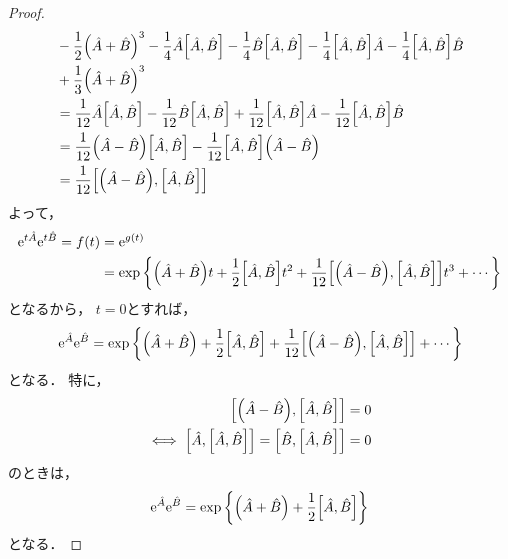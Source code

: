 \documentclass{report}
\begin{document}
\begin{proof}
\begin{align}
        &- \frac{1}{2}\qty(\hat{A} + \hat{B})^3 - \frac{1}{4}\hat{A}\qty[\hat{A}, \hat{B}] - \frac{1}{4}\hat{B}\qty[\hat{A}, \hat{B}] - \frac{1}{4}\qty[\hat{A}, \hat{B}]\hat{A} - \frac{1}{4}\qty[\hat{A}, \hat{B}]\hat{B} \notag \\ 
        &+ \frac{1}{3}\qty(\hat{A} + \hat{B})^3 \\ 
        &= \frac{1}{12}\hat{A}\qty[\hat{A}, \hat{B}] - \frac{1}{12}\hat{B}\qty[\hat{A}, \hat{B}] + \frac{1}{12}\qty[\hat{A}, \hat{B}]\hat{A} - \frac{1}{12}\qty[\hat{A}, \hat{B}]\hat{B} \\ 
        &= \frac{1}{12}\qty(\hat{A} - \hat{B})\qty[\hat{A}, \hat{B}] - \frac{1}{12}\qty[\hat{A}, \hat{B}]\qty(\hat{A} - \hat{B}) \\ 
        &= \frac{1}{12}\qty[\qty(\hat{A} - \hat{B}), \qty[\hat{A}, \hat{B}]]
      \end{align}
      よって，
      \begin{align}
        \mathrm{e}^{t\hat{A}}\mathrm{e}^{t\hat{B}} = f(t) &= \mathrm{e}^{g(t)} \\ 
        &= \exp\qty{\qty(\hat{A} + \hat{B})t + \frac{1}{2}\qty[\hat{A}, \hat{B}]t^2 + \frac{1}{12}\qty[\qty(\hat{A} - \hat{B}), \qty[\hat{A}, \hat{B}]]t^3 + \cdots} \\ 
      \end{align}
      となるから，
      $t = 0$とすれば，
      \begin{align}
        \mathrm{e}^{\hat{A}}\mathrm{e}^{\hat{B}} = \exp\qty{\qty(\hat{A} + \hat{B}) + \frac{1}{2}\qty[\hat{A}, \hat{B}] + \frac{1}{12}\qty[\qty(\hat{A} - \hat{B}), \qty[\hat{A}, \hat{B}]] + \cdots}
      \end{align}
      となる．
      特に，
      \begin{align}
        \qty[\qty(\hat{A} - \hat{B}), \qty[\hat{A}, \hat{B}]] = 0 \\ 
        \iff \qty[\hat{A}, \qty[\hat{A}, \hat{B}]] = \qty[\hat{B}, \qty[\hat{A}, \hat{B}]] = 0
      \end{align}
      のときは，
      \begin{align}
        \mathrm{e}^{\hat{A}}\mathrm{e}^{\hat{B}} = \exp\qty{\qty(\hat{A} + \hat{B}) + \frac{1}{2}\qty[\hat{A}, \hat{B}]}
      \end{align}
      となる．
    \end{proof}
\end{document}
